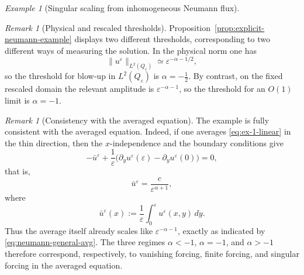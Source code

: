 \documentclass[11pt]{article}
\theoremstyle{definition}
\theoremstyle{remark}
\newtheorem{remark}[theorem]{Remark}
\newtheorem{example}[theorem]{Example}
\numberwithin{equation}{section}
\newcommand{\eps}{\varepsilon}
\newcommand{\mc}[1]{\mathcal{#1}}
\begin{document}
\begin{example}[Singular scaling from inhomogeneous Neumann flux]

\begin{remark}[Physical and rescaled thresholds]\label{rem:interpret-example-l2}
Proposition~\ref{prop:explicit-neumann-example} displays two different thresholds, corresponding to two different ways of measuring the solution. In the physical norm one has
\[
\|u^\varepsilon\|_{L^2(Q_\varepsilon)}\simeq \varepsilon^{-\alpha-1/2},
\]
so the threshold for blow-up in $L^2(Q_\varepsilon)$ is $\alpha=-\tfrac12$. By contrast, on the fixed rescaled domain the relevant amplitude is $\varepsilon^{-\alpha-1}$, so the threshold for an $O(1)$ limit is $\alpha=-1$.
\end{remark}

\begin{remark}[Consistency with the averaged equation]\label{rem:interpret-example-average}
The example is fully consistent with the averaged equation. Indeed, if one averages \eqref{eq:ex-1-linear} in the thin direction, then the $x$-independence and the boundary conditions give
\[
-\bar u^\varepsilon + \frac1\varepsilon\bigl(\partial_yu^\varepsilon(\varepsilon)-\partial_yu^\varepsilon(0)\bigr)=0,
\]
that is,
\[
\bar u^\varepsilon = \frac{c}{\varepsilon^{\alpha+1}},
\]
where
\[
\bar u^\varepsilon(x):=\frac1\varepsilon\int_0^\varepsilon u^\varepsilon(x,y)\,dy.
\]
Thus the average itself already scales like $\varepsilon^{-\alpha-1}$, exactly as indicated by \eqref{eq:neumann-general-avg}. The three regimes $\alpha<-1$, $\alpha=-1$, and $\alpha>-1$ therefore correspond, respectively, to vanishing forcing, finite forcing, and singular forcing in the averaged equation.
\end{remark}

\end{example}
\end{document}
